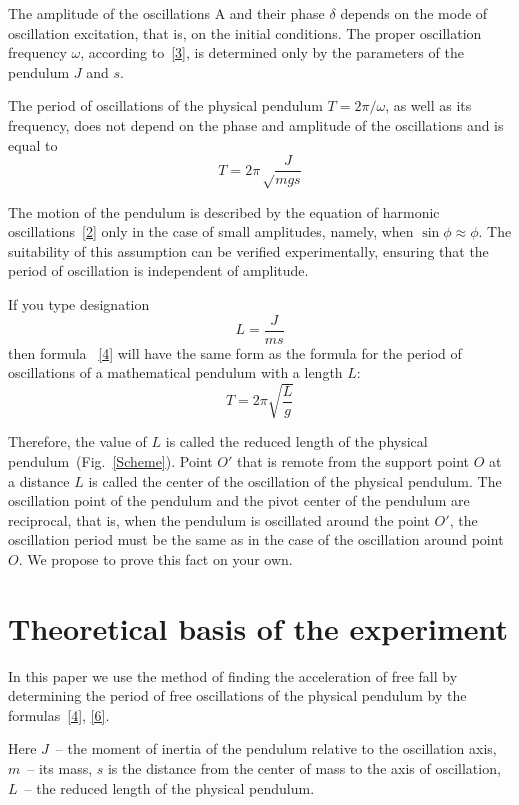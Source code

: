 \documentclass{LabWorkEng}
\begin{document}
The amplitude of the oscillations A and their phase $\delta$ depends on the mode of oscillation excitation, that is, on the initial conditions. The proper oscillation frequency $\omega$, according to~\eqref{3}, is determined only by the parameters of the pendulum $J$ and $s$.

The period of oscillations of the physical pendulum $T = 2\pi/\omega$, as well as its frequency, does not depend on the phase and amplitude of the oscillations and is equal to
\begin{equation}\label{4}
	T = 2\pi \sqrt \frac{J}{mgs}
\end{equation}

The motion of the pendulum is described by the equation of harmonic oscillations~\eqref{2} only in the case of small amplitudes, namely, when $\sin\phi \approx\phi$. The suitability of this assumption can be verified experimentally, ensuring that the period of oscillation is independent of amplitude.

If you type designation
\begin{equation}\label{5}
	L = \frac{J}{ms}
\end{equation}
then formula ~\eqref{4}  will have the same form as the formula for the period of oscillations of a mathematical pendulum with a length $L$:
\begin{equation}\label{6}
	T = 2\pi \sqrt {\frac{L}{g}}
\end{equation}

Therefore, the value of  $L$ is called the reduced length of the physical pendulum~(Fig.~\ref{Scheme}). Point $O'$ that is remote from the support point $O$ at a distance $L$ is called the center of the oscillation of the physical pendulum. The oscillation point of the pendulum and the pivot center of the pendulum are reciprocal, that is, when the pendulum is oscillated around the point $O'$, the oscillation period must be the same as in the case of the oscillation around point $O$. We propose to prove this fact on your own.


\section{Theoretical basis of the experiment}

In this paper we use the method of finding the acceleration of free fall by determining the period of free oscillations of the physical pendulum by the formulas~\eqref{4}, \eqref{6}.

Here $J$~-- the moment of inertia of the pendulum relative to the oscillation axis, $m$~-- its mass, $s$ is the distance from the center of mass to the axis of oscillation, $L$~-- the reduced length of the physical pendulum.
\end{document}

